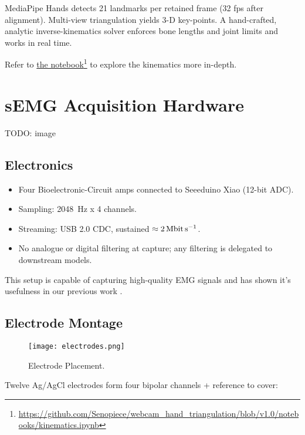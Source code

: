 MediaPipe Hands detects 21 landmarks per retained frame (32 fps after
alignment). Multi-view triangulation yields 3-D key-points. A hand-crafted,
analytic inverse-kinematics solver enforces bone lengths and joint limits and works in real time.

Refer to \href{https://github.com/Senopiece/webcam_hand_triangulation/blob/v1.0/notebooks/kinematics.ipynb}{the notebook}\footnote{\url{https://github.com/Senopiece/webcam_hand_triangulation/blob/v1.0/notebooks/kinematics.ipynb}} to explore the kinematics more in-depth. 

\section{sEMG Acquisition Hardware}

TODO: image

\subsection{Electronics}
\begin{itemize}
  \item Four Bioelectronic-Circuit amps connected to Seeeduino Xiao (12-bit ADC).
  \item Sampling: \SI{2048}{Hz} x 4 channels.
  \item Streaming: USB 2.0 CDC, sustained $\approx \SI{2}{\mega\bit\per\second}$.
  \item No analogue or digital filtering at capture; any filtering is delegated
        to downstream models.
\end{itemize}

This setup is capable of capturing high-quality EMG signals and has shown it's usefulness in our previous work \cite{nasybullin2024methodology}.

\subsection{Electrode Montage}

\begin{figure}[H]
    \centering
    \texttt{[image: electrodes.png]}
    \caption{Electrode Placement.}
    \label{fig:electrodes}
\end{figure}

Twelve Ag/AgCl electrodes form four bipolar channels + reference to cover:

